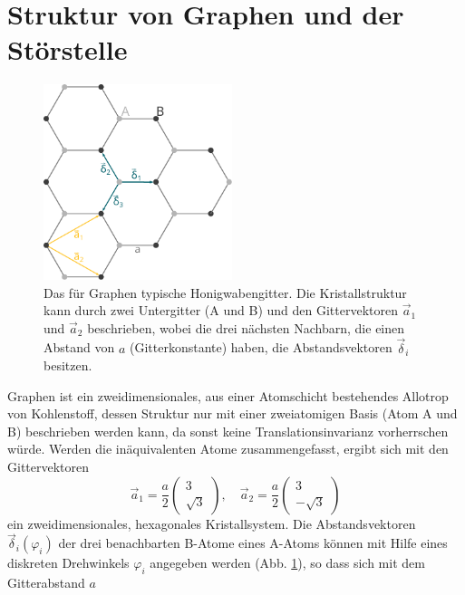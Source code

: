 \section{Struktur von Graphen und der Störstelle}
\label{sec:structure}
\begin{figure}
    \centering
    \includegraphics[width = 0.49\textwidth]{Plots/graphene_lattice.pdf}
    \caption{Das für Graphen typische Honigwabengitter. Die Kristallstruktur kann durch zwei Untergitter (A und B) und den 
    Gittervektoren $\vec{a}_1$ und $\vec{a}_2$ beschrieben, wobei
    die drei nächsten Nachbarn, die einen Abstand von $a$ (Gitterkonstante) haben, die Abstandsvektoren $\vec{\delta}_i$ besitzen.}
    \label{fig:graphene_lattice}
\end{figure}
Graphen ist ein zweidimensionales, aus einer Atomschicht bestehendes Allotrop von Kohlenstoff, dessen
Struktur nur mit einer zweiatomigen Basis (Atom A und B) beschrieben werden kann, da sonst keine Translationsinvarianz vorherrschen würde.
Werden die inäquivalenten Atome zusammengefasst, ergibt sich mit den Gittervektoren 
\begin{equation*}
        \vec{a}_1 = \frac{a}{2}\begin{pmatrix} 3 \\[4pt] \sqrt{3}  \end{pmatrix}, \quad
        \vec{a}_2 = \frac{a}{2}\begin{pmatrix} 3 \\[4pt] -\sqrt{3} \end{pmatrix}       
\end{equation*}    
ein zweidimensionales, hexagonales Kristallsystem.
Die Abstandsvektoren $\vec{\delta}_i(\varphi_i)$ der drei benachbarten B-Atome eines A-Atoms können mit Hilfe eines 
diskreten Drehwinkels $\varphi_i$ angegeben werden (Abb. \ref{fig:graphene_lattice}), so dass sich mit dem Gitterabstand $a$
